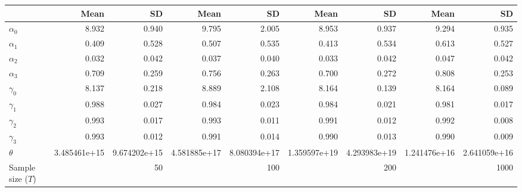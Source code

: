 
\begin{tabular}[t]{lrrrrrrrr}
\toprule
  & Mean & SD & Mean  & SD  & Mean   & SD   & Mean    & SD   \\
\midrule
$\alpha_{0}$ & 8.932 & 0.940 & 9.795 & 2.005 & 8.953 & 0.937 & 9.294 & 0.935\\
$\alpha_{1}$ & 0.409 & 0.528 & 0.507 & 0.535 & 0.413 & 0.534 & 0.613 & 0.527\\
$\alpha_{2}$ & 0.032 & 0.042 & 0.037 & 0.040 & 0.033 & 0.042 & 0.047 & 0.042\\
$\alpha_{3}$ & 0.709 & 0.259 & 0.756 & 0.263 & 0.700 & 0.272 & 0.808 & 0.253\\
$\gamma_{0}$ & 8.137 & 0.218 & 8.889 & 2.108 & 8.164 & 0.139 & 8.164 & 0.089\\
$\gamma_{1}$ & 0.988 & 0.027 & 0.984 & 0.023 & 0.984 & 0.021 & 0.981 & 0.017\\
$\gamma_{2}$ & 0.993 & 0.017 & 0.993 & 0.011 & 0.991 & 0.012 & 0.992 & 0.008\\
$\gamma_{3}$ & 0.993 & 0.012 & 0.991 & 0.014 & 0.990 & 0.013 & 0.990 & 0.009\\
$\theta$ & 3.485461e+15 & 9.674202e+15 & 4.581885e+17 & 8.080394e+17 & 1.359597e+19 & 4.293983e+19 & 1.241476e+16 & 2.641059e+16\\
Sample size ($T$) &  & 50 &  & 100 &  & 200 &  & 1000\\
\bottomrule
\end{tabular}
